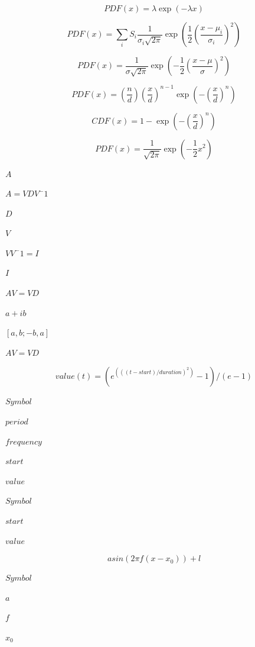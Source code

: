 \documentclass{article}
\begin{document}
\[
    PDF(x) = \lambda \exp(- \lambda x)
\]
\pagebreak

\[
    PDF(x) = \sum_i S_i \frac{1}{\sigma_i \sqrt{2 \pi}}  \exp \left( \frac{1}{2} \left( \frac{x - \mu_i}{\sigma_i}  \right)^2 \right)
\]
\pagebreak

\[
    PDF(x) = \frac{1}{\sigma \sqrt{2 \pi}} \exp  \left( - \frac{1}{2} \left( \frac{x - \mu}{\sigma} \right)^2 \right)
\]
\pagebreak

\[
    PDF(x) = \left( \frac{n}{d} \right) \left( \frac{x}{d} \right)^{n-1}  \exp \left( - \left(\frac{x}{d} \right)^n \right)
\]
\pagebreak

\[
    CDF(x) = 1 - \exp \left( - \left( \frac{x}{d} \right)^n \right)
\]
\pagebreak

\[
    PDF(x) = \frac{1}{\sqrt{2 \pi}} \exp \left( - \frac{1}{2} x^2 \right)
\]
\pagebreak

$ A $
\pagebreak

$ A = VDV^-1 $
\pagebreak

$ D $
\pagebreak

$ V $
\pagebreak

$ VV^-1 = I $
\pagebreak

$ I $
\pagebreak

$ AV = VD
$
\pagebreak

$ a + ib $
\pagebreak

$ [a, b; -b, a] $
\pagebreak

$ AV = VD $
\pagebreak

\[
    value(t) = (e^(((t - start)/duration)^2) - 1)/(e - 1)
\]
\pagebreak

$        Symbol    $
\pagebreak

$        period    $
\pagebreak

$        frequency $
\pagebreak

$        start     $
\pagebreak

$        value     $
\pagebreak

$        Symbol $
\pagebreak

$        start  $
\pagebreak

$        value  $
\pagebreak

\[
        a sin(2 \pi f (x - x_0)) + l
    \]
\pagebreak

$        Symbol  $
\pagebreak

$        a       $
\pagebreak

$        f       $
\pagebreak

$        x_0     $
\pagebreak
\end{document}

